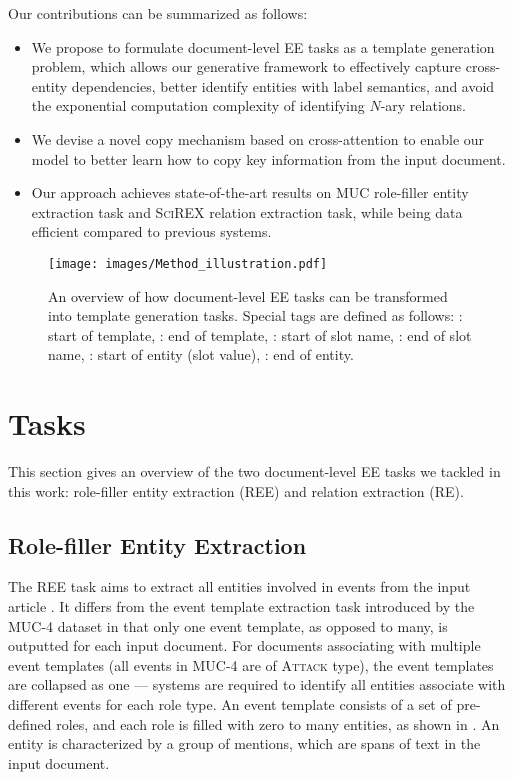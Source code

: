 \documentclass[11pt]{article}
\begin{document}
Our contributions can be summarized as follows:
\begin{itemize}
  \item We propose to formulate document-level EE tasks as a template generation problem, which allows our generative framework to effectively capture cross-entity dependencies, better identify entities with label semantics, and avoid the exponential computation complexity of identifying $N$-ary relations.
  \item We devise a novel copy mechanism based on cross-attention to enable our model to better learn how to copy key information from the input document.
  \item Our approach achieves state-of-the-art results on MUC role-filler entity extraction task and \textsc{SciREX} relation extraction task, while being data efficient compared to previous systems.
\end{itemize}

 \begin{figure*}[t]
    \centering
    \texttt{[image: images/Method\_illustration.pdf]}
    \caption{An overview of how document-level EE tasks can be transformed into template generation tasks. Special tags are defined as follows: : start of template, : end of template, : start of slot name, : end of slot name, : start of entity (slot value), : end of entity.}
    \label{fig:method}
    \vspace{-5mm}
\end{figure*}
\section{Tasks}
This section gives an overview of the two document-level EE tasks we tackled in this work: role-filler entity extraction (REE) and relation extraction (RE). \subsection{Role-filler Entity Extraction}
The REE task aims to extract all entities involved in events from the input article \cite{du-2020-grit}. 
It differs from the event template extraction task introduced by the MUC-4 dataset \cite{muc-1992-message} in that only one event template, as opposed to many, is outputted for each input document. For documents associating with multiple event templates (all events in MUC-4 are of \textsc{Attack} type), the event templates are collapsed as one --- systems are required to identify all entities associate with different events for each role type. An event template consists of a set of pre-defined roles, and each role is filled with zero to many entities, as shown in . An entity is characterized by a group of mentions, which are spans of text in the input document. 
\end{document}
